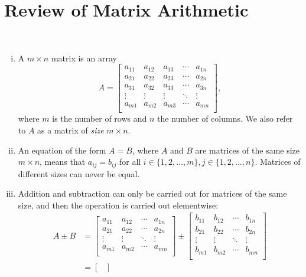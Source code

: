 \section{Review of Matrix Arithmetic}
\label{sec:rma}
\begin{definition}[Matrices] ~\\
\begin{enumerate}[(i)]
	\item A $m \times n$ matrix is an array
		\[A = \begin{bmatrix}
		a_{11} & a_{12} & a_{13} & \cdots & a_{1n} \\
		a_{21} & a_{22} & a_{23} & \cdots & a_{2n} \\
		a_{31} & a_{32} & a_{33} & \cdots & a_{3n} \\
		\vdots & \vdots & \vdots & \ddots & \vdots \\
		a_{m1} & a_{m2} & a_{m3} & \cdots & a_{mn} \\
		\end{bmatrix},\]
		where $m$ is the number of rows and $n$ the number of columns. We also refer to $A$ as a matrix of \emph{size} $m \times n$.
	\item An equation of the form $A=B$, where $A$ and $B$ are matrices of the same size $m \times n$, means that $a_{ij} = b_{ij}$ for all $i\in\{1,2,\dots,m\},j\in\{1,2,\dots,n\}.$ Matrices of different sizes can never be equal.
	\item Addition and subtraction can only be carried out for matrices of the same size, and then the operation is carried out elementwise:
		\begin{equation*}\begin{split}
		A \pm B & = \begin{bmatrix}
		a_{11} & a_{12} & \cdots & a_{1n} \\
		a_{21} & a_{22} & \cdots & a_{2n} \\
		\vdots & \vdots & \ddots & \vdots \\
		a_{m1} & a_{m2} & \cdots & a_{mn} \\
		\end{bmatrix} \pm \begin{bmatrix}
		b_{11} & b_{12} & \cdots & b_{1n} \\
		b_{21} & b_{22} & \cdots & b_{2n} \\
		\vdots & \vdots & \ddots & \vdots \\
		b_{m1} & b_{m2} & \cdots & b_{mn} \\
		\end{bmatrix} \\ & = \begin{bmatrix}

\end{bmatrix}
\end{split}
\end{equation*}
\end{enumerate}
\end{definition}

